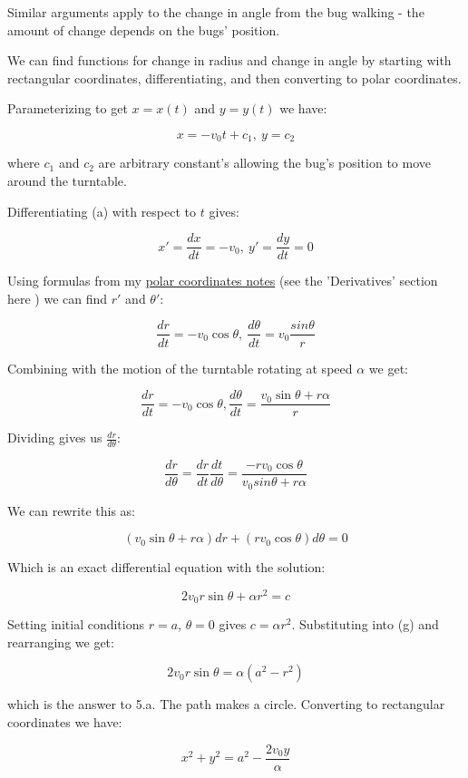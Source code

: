 \documentclass{article}
\begin{document}
Similar arguments apply to the change in angle from the bug walking - the amount of change depends on the bugs' position.

We can find functions for change in radius and change in angle by starting with rectangular coordinates, differentiating, and then converting to polar coordinates.

Parameterizing to get $x = x(t)$ and $y = y(t)$ we have:

\[ x = -v_0t + c_1, ~y = c_2 \tag{5.a} \]

where $c_1$ and $c_2$ are arbitrary constant's allowing the bug's position to move around the turntable.

Differentiating (a) with respect to $t$ gives:

\[ x' = \frac{dx}{dt} = -v_0, ~ y' = \frac{dy}{dt} = 0 \tag{5.b} \]

Using formulas from my \href{https://jhobbs.github.io/mathnotes/calculus/polar-coordinates.html}{polar coordinates notes} (see the 'Derivatives' section here ) we can find $r'$ and $\theta'$:

\[ \frac{dr}{dt} = -v_0\cos\theta, ~ \frac{d\theta}{dt} = v_0\frac{sin\theta}{r} \tag{5.c} \]

Combining with the motion of the turntable rotating at speed $\alpha$ we get:

\[ \frac{dr}{dt} = -v_0\cos\theta, \frac{d\theta}{dt} = \frac{v_0\sin\theta + r\alpha}{r} \tag{5.d} \]

Dividing gives us $\frac{dr}{d\theta}$:

\[ \frac{dr}{d\theta} = \frac{dr}{dt}\frac{dt}{d\theta} = \frac{-rv_0\cos\theta}{v_0sin\theta + r\alpha} \tag{5.e} \]

We can rewrite this as:

\[ (v_0\sin\theta + r\alpha)dr + (rv_0\cos\theta)d\theta = 0 \tag{5.f} \]

Which is an exact differential equation with the solution:

\[ 2v_0r\sin\theta + \alpha r^2 = c \tag{5.g} \]

Setting initial conditions $r = a$, $\theta = 0$ gives $c = \alpha r^2$. Substituting into (g) and rearranging we get:

\[ 2v_0r\sin\theta = \alpha (a^2 - r^2) \tag{5.h} \]

which is the answer to 5.a. The path makes a circle. Converting to rectangular coordinates we have:

\[ x^2 + y^2 = a^2 - \frac{2v_0y}{\alpha} \tag{5.i} \]
\end{document}
